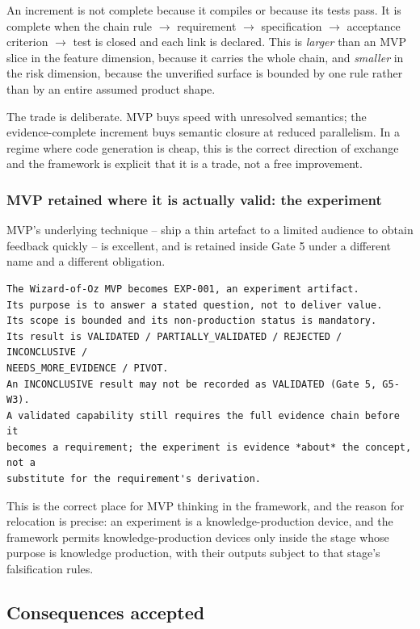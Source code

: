 \documentclass[11pt,a4paper]{article}
\begin{document}
An increment is not complete because it compiles or because its tests pass. It is complete when the chain rule $\rightarrow$ requirement $\rightarrow$ specification $\rightarrow$ acceptance criterion $\rightarrow$ test is closed and each link is declared. This is \emph{larger} than an MVP slice in the feature dimension, because it carries the whole chain, and \emph{smaller} in the risk dimension, because the unverified surface is bounded by one rule rather than by an entire assumed product shape.

The trade is deliberate. MVP buys speed with unresolved semantics; the evidence-complete increment buys semantic closure at reduced parallelism. In a regime where code generation is cheap, this is the correct direction of exchange and the framework is explicit that it is a trade, not a free improvement.

\subsubsection{MVP retained where it is actually valid: the experiment}

MVP's underlying technique -- ship a thin artefact to a limited audience to obtain feedback quickly -- is excellent, and is retained inside Gate 5 under a different name and a different obligation.

\begin{Verbatim}[fontsize=\footnotesize,breaklines=true,breakanywhere=true,breakautoindent=false,samepage=false]
The Wizard-of-Oz MVP becomes EXP-001, an experiment artifact.
Its purpose is to answer a stated question, not to deliver value.
Its scope is bounded and its non-production status is mandatory.
Its result is VALIDATED / PARTIALLY_VALIDATED / REJECTED / INCONCLUSIVE /
NEEDS_MORE_EVIDENCE / PIVOT.
An INCONCLUSIVE result may not be recorded as VALIDATED (Gate 5, G5-W3).
A validated capability still requires the full evidence chain before it
becomes a requirement; the experiment is evidence *about* the concept, not a
substitute for the requirement's derivation.
\end{Verbatim}

This is the correct place for MVP thinking in the framework, and the reason for relocation is precise: an experiment is a knowledge-production device, and the framework permits knowledge-production devices only inside the stage whose purpose is knowledge production, with their outputs subject to that stage's falsification rules.

\subsection{Consequences accepted}
\end{document}

